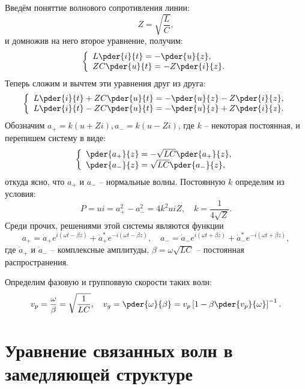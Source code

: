 \documentclass{hedwork}
\begin{document}
Введём поняттие волнового сопротивления линии:
\begin{equation}
    Z = \sqrt{\frac{L}{C}},
\end{equation}
и домножив на него второе уравнение, получим:
\begin{equation}
    \left\{
        \begin{array}{l}
            L\pder{i}{t} = -\pder{u}{z},\\
            ZC\pder{u}{t} = -Z\pder{i}{z}.
    \end{array}
    \right.
\end{equation}
Теперь сложим и вычтем эти уравнения друг из друга:
\begin{equation}
    \left\{
        \begin{array}{l}
            L\pder{i}{t} + ZC\pder{u}{t} = -\pder{u}{z} - Z\pder{i}{z},\\
            L\pder{i}{t} - ZC\pder{u}{t} = -\pder{u}{z} + Z\pder{i}{z}.
    \end{array}
    \right.
\end{equation}
Обозначим \( a_+ = k(u + Zi), a_- = k(u - Zi) \), где \( k \) -- некоторая
постоянная, и перепишем систему в виде:
\begin{equation}
    \left\{
        \begin{array}{l}
            \pder{a_+}{z} = -\sqrt{LC}\pder{a_+}{z},\\
            \pder{a_-}{z} = \sqrt{LC}\pder{a_-}{z},
    \end{array}
    \right.
\end{equation}
откуда ясно, что \( a_+ \) и \( a_- \) -- нормальные волны. Постоянную \( k \)
определим из условия:
\begin{equation}
    P = ui = a_+^2 - a_-^2 = 4k^2uiZ,\quad k = \frac{1}{4\sqrt{Z}}.
\end{equation}
Среди прочих, решениями этой системы являются функции
\begin{equation}
    a_+ = \dot{a}_+e^{i(\omega t - \beta z)} +
          \dot{a}_+^*e^{-i(\omega t - \beta z)},\quad
    a_- = \dot{a}_-e^{i(\omega t + \beta z)} +
          \dot{a}_-^*e^{-i(\omega t + \beta z)},
\end{equation}
где \( \dot{a}_+ \) и \( \dot{a}_- \) -- комплексные амплитуды,
\( \beta = \omega\sqrt{LC} \) -- постоянная распространения.

Определим фазовую и групповвую скорости таких волн:
\begin{equation}
    v_p = \frac{\omega}{\beta} = \sqrt{\frac{1}{LC}},\quad
    v_g = \pder{\omega}{\beta} = v_p\left[1-\beta\pder{v_p}{\omega}\right]^{-1}.
\end{equation}

\section{Уравнение связанных волн в замедляющей структуре}
\end{document}
